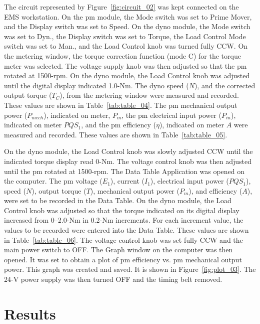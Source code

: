 \documentclass{article}
\begin{document}
\label{part3} The circuit represented by Figure~\ref{fig:circuit_02} was kept
connected on the EMS workstation.  On the \gls{pm} module, the Mode switch was
set to Prime Mover, and the Display switch was set to Speed. On the \gls{dyno}
module, the Mode switch was set to Dyn., the Display switch was set to Torque,
the Load Control Mode switch was set to Man., and the Load Control knob was
turned fully {CCW}. On the metering window, the torque correction function
(mode C) for the torque meter was selected. The voltage supply knob was then
adjusted so that the \gls{pm} rotated at 1500-rpm. On the \gls{dyno} module,
the Load Control knob was adjusted until the digital display indicated 1.0-Nm.
The \gls{dyno} speed ($N$), and the corrected output torque ($T_C$), from the
metering window were measured and recorded. These values are shown in
Table~\ref{tab:table_04}. The \gls{pm} mechanical output power ($P_{mech}$),
indicated on meter, $P_m$, the \gls{pm} electrical input power ($P_{in}$),
indicated on meter $PQS_1$, and the \gls{pm} efficiency ($\eta$), indicated on
meter $A$ were measured and recorded. These values are shown in
Table~\ref{tab:table_05}.

On the \gls{dyno} module, the Load Control knob was slowly adjusted CCW until
the indicated torque display read 0-Nm. The voltage control knob was then
adjusted until the \gls{pm} rotated at 1500-rpm. The Data Table Application was
opened on the computer. The \gls{pm} voltage ($E_1$), current ($I_1$),
electrical input power ($PQS_1$), speed ($N$), output torque ($T$), mechanical
output power ($P_{m}$), and efficiency ($A$), were set to be recorded in the
Data Table. On the \gls{dyno} module, the Load Control knob was adjusted so
that the torque indicated on its digital display increased from 0--2.0-Nm in
0.2-Nm increments.  For each increment value, the values to be recorded were
entered into the Data Table. These values are shown in
Table~\ref{tab:table_06}. The voltage control knob was set fully CCW and the
main power switch to {OFF}. The Graph window on the computer was then opened.
It was set to obtain a plot of \gls{pm} efficiency vs. \gls{pm} mechanical
output power. This graph was created and saved. It is shown in
Figure~\ref{fig:plot_03}. The 24-V power supply was then turned OFF and the
timing belt removed.

\section{Results}
\end{document}

